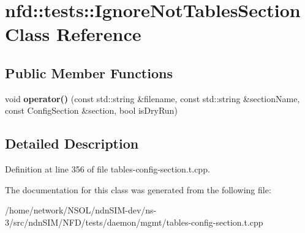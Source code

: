 \hypertarget{classnfd_1_1tests_1_1IgnoreNotTablesSection}{}\section{nfd\+:\+:tests\+:\+:Ignore\+Not\+Tables\+Section Class Reference}
\label{classnfd_1_1tests_1_1IgnoreNotTablesSection}
\subsection*{Public Member Functions}
\begin{DoxyCompactItemize}
\item 
void {\bfseries operator()} (const std\+::string \&filename, const std\+::string \&section\+Name, const Config\+Section \&section, bool is\+Dry\+Run)\hypertarget{classnfd_1_1tests_1_1IgnoreNotTablesSection_a2cd13e954b09220a683673704c0dbd1e}{}\label{classnfd_1_1tests_1_1IgnoreNotTablesSection_a2cd13e954b09220a683673704c0dbd1e}

\end{DoxyCompactItemize}


\subsection{Detailed Description}


Definition at line 356 of file tables-\/config-\/section.\+t.\+cpp.



The documentation for this class was generated from the following file\+:\begin{DoxyCompactItemize}
\item 
/home/network/\+N\+S\+O\+L/ndn\+S\+I\+M-\/dev/ns-\/3/src/ndn\+S\+I\+M/\+N\+F\+D/tests/daemon/mgmt/tables-\/config-\/section.\+t.\+cpp\end{DoxyCompactItemize}
